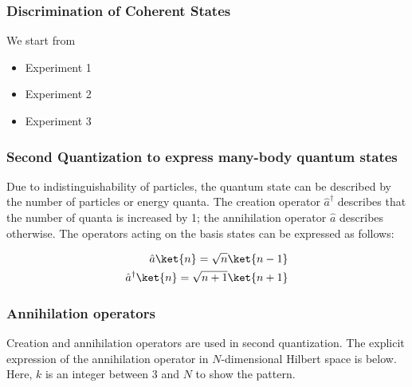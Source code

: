 \documentclass{beamer}
\begin{document}
\begin{frame}
  \frametitle{Discrimination of Coherent States}
  We start from
  \begin{itemize}
    \item Experiment 1
    \item Experiment 2
    \item Experiment 3
  \end{itemize}
\end{frame}

\begin{frame}[label=frame6]
  \frametitle{Second Quantization to express many-body quantum states}
  Due to indistinguishability of particles, the quantum state can be described by the number of particles
  or energy quanta.
  The creation operator $\hat{a}^\dagger$ describes that the number of quanta is increased by 1; the annihilation
  operator $\hat{a}$ describes otherwise.
  The operators acting on the basis states can be expressed as follows:

  \begin{align}
    \hat{a}\ket{n} = \sqrt{n}\ket{n-1} \\
    \hat{a}^{\dagger}\ket{n} = \sqrt{n+1}\ket{n+1}
  \end{align}
\end{frame}

\begin{frame}
  \frametitle{Annihilation operators}
  Creation and annihilation operators are used in second quantization.
  The explicit expression of the annihilation operator in $N$-dimensional Hilbert space is below.
  Here, $k$ is an integer between 3 and $N$ to show the pattern.

  \begin{center}
  \end{center}
\end{frame}
\end{document}
